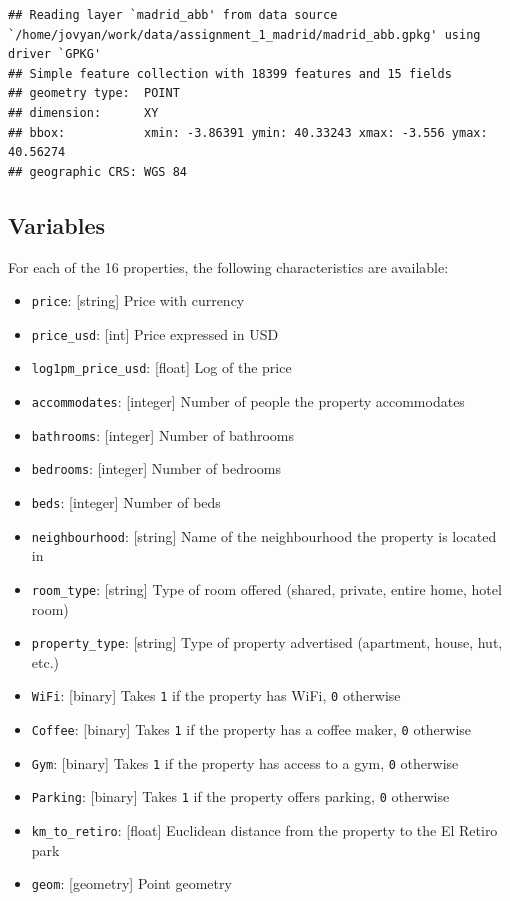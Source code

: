\documentclass[
]{book}
\providecommand{\tightlist}{%
  \setlength{\itemsep}{0pt}\setlength{\parskip}{0pt}}
\begin{document}
\begin{verbatim}
## Reading layer `madrid_abb' from data source `/home/jovyan/work/data/assignment_1_madrid/madrid_abb.gpkg' using driver `GPKG'
## Simple feature collection with 18399 features and 15 fields
## geometry type:  POINT
## dimension:      XY
## bbox:           xmin: -3.86391 ymin: 40.33243 xmax: -3.556 ymax: 40.56274
## geographic CRS: WGS 84
\end{verbatim}

\hypertarget{variables}{%
\subsection*{Variables}\label{variables}}

For each of the 16 properties, the following characteristics are available:

\begin{itemize}
\tightlist
\item
  \texttt{price}: {[}string{]} Price with currency
\item
  \texttt{price\_usd}: {[}int{]} Price expressed in USD
\item
  \texttt{log1pm\_price\_usd}: {[}float{]} Log of the price
\item
  \texttt{accommodates}: {[}integer{]} Number of people the property accommodates
\item
  \texttt{bathrooms}: {[}integer{]} Number of bathrooms
\item
  \texttt{bedrooms}: {[}integer{]} Number of bedrooms
\item
  \texttt{beds}: {[}integer{]} Number of beds
\item
  \texttt{neighbourhood}: {[}string{]} Name of the neighbourhood the property is located in
\item
  \texttt{room\_type}: {[}string{]} Type of room offered (shared, private, entire home, hotel room)
\item
  \texttt{property\_type}: {[}string{]} Type of property advertised (apartment, house, hut, etc.)
\item
  \texttt{WiFi}: {[}binary{]} Takes \texttt{1} if the property has WiFi, \texttt{0} otherwise
\item
  \texttt{Coffee}: {[}binary{]} Takes \texttt{1} if the property has a coffee maker, \texttt{0} otherwise
\item
  \texttt{Gym}: {[}binary{]} Takes \texttt{1} if the property has access to a gym, \texttt{0} otherwise
\item
  \texttt{Parking}: {[}binary{]} Takes \texttt{1} if the property offers parking, \texttt{0} otherwise
\item
  \texttt{km\_to\_retiro}: {[}float{]} Euclidean distance from the property to the El Retiro park
\item
  \texttt{geom}: {[}geometry{]} Point geometry
\end{itemize}
\end{document}
